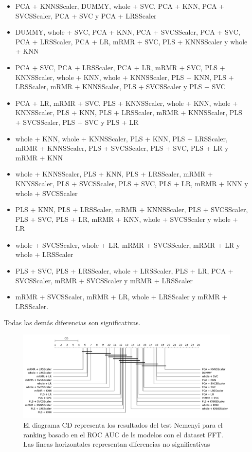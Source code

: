 \documentclass[a4paper,oneside,11pt,leqno]{article}
\begin{document}
	\begin{itemize}
		\item PCA + KNNSScaler, DUMMY, whole + SVC, PCA + KNN, PCA + SVCSScaler, PCA + SVC y PCA + LRSScaler
		
		\item DUMMY, whole + SVC, PCA + KNN, PCA + SVCSScaler, PCA + SVC, PCA + LRSScaler, PCA + LR, mRMR + SVC, PLS + KNNSScaler y whole + KNN
		
		\item  PCA + SVC, PCA + LRSScaler, PCA + LR, mRMR + SVC, PLS + KNNSScaler, whole + KNN, whole + KNNSScaler, PLS + KNN, PLS + LRSScaler, mRMR + KNNSScaler, PLS + SVCSScaler y PLS + SVC
		
		\item PCA + LR, mRMR + SVC, PLS + KNNSScaler, whole + KNN, whole + KNNSScaler, PLS + KNN, PLS + LRSScaler, mRMR + KNNSScaler, PLS + SVCSScaler, PLS + SVC y PLS + LR
		
		\item whole + KNN, whole + KNNSScaler, PLS + KNN, PLS + LRSScaler, mRMR + KNNSScaler, PLS + SVCSScaler, PLS + SVC, PLS + LR y mRMR + KNN
		
		\item whole + KNNSScaler, PLS + KNN, PLS + LRSScaler, mRMR + KNNSScaler, PLS + SVCSScaler, PLS + SVC, PLS + LR, mRMR + KNN y whole + SVCSScaler
		
		\item PLS + KNN, PLS + LRSScaler, mRMR + KNNSScaler, PLS + SVCSScaler, PLS + SVC, PLS + LR, mRMR + KNN, whole + SVCSScaler y whole + LR
		
		\item whole + SVCSScaler, whole + LR, mRMR + SVCSScaler, mRMR + LR y whole + LRSScaler
		
		\item PLS + SVC, PLS + LRSScaler, whole + LRSScaler, PLS + LR, PCA + SVCSScaler, mRMR + SVCSScaler y mRMR + LRSScaler
		
		\item mRMR + SVCSScaler, mRMR + LR, whole + LRSScaler y mRMR + LRSScaler. 
	\end{itemize}
	
	Todas las demás diferencias son significativas.
	
	\begin{figure}[h]
		\includegraphics[width=\linewidth]{stat_results_fft.pdf}
		\caption{El diagrama CD representa los resultados del test Nemenyi para el ranking basado en el ROC AUC de ls modelos con el dataset FFT. Las lineas horizontales representan diferencias no significativas}
		\label{fig:stats_fig_fft}
	\end{figure}
\end{document}
